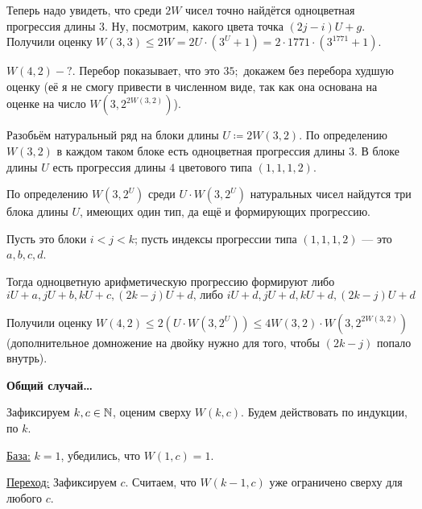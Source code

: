 \documentclass[a4paper]{report}
\begin{document}
{{            Теперь надо увидеть, что среди $2W$ чисел точно найдётся одноцветная прогрессия длины $3$.
            Ну, посмотрим, какого цвета точка $(2j - i)U + g$.
            Получили оценку $W(3, 3) \le 2W = 2U \cdot (3^U + 1) = 2 \cdot 1771 \cdot (3^{1771} + 1)$.
            \item $W(4, 2) - ?$. Перебор показывает, что это $35$;\ докажем без перебора худшую оценку (её я не смогу привести в численном виде, так как она основана на оценке на число $W(3, 2^{2W(3, 2)})$).

            Разобьём натуральный ряд на блоки длины $U \coloneqq 2W(3, 2)$. По определению $W(3, 2)$ в каждом таком блоке есть одноцветная прогрессия длины $3$.
            В блоке длины $U$ есть прогрессия длины $4$ цветового типа $(1,1,1,2)$.

            По определению $W(3, 2^{U})$ среди $U \cdot W(3, 2^{U})$  натуральных чисел найдутся три блока длины $U$, имеющих один тип, да ещё и формирующих прогрессию.

            Пусть это блоки $i < j < k$; пусть индексы прогрессии типа $(1,1,1,2)$ --- это $a, b, c, d$.

            Тогда одноцветную арифметическую прогрессию формируют либо \[iU + a, jU + b, kU + c, (2k - j)U + d\text{, либо }iU + d, jU + d, kU + d, (2k - j)U + d\]

            Получили оценку $W(4, 2) \le 2(U \cdot W(3, 2^U)) \le 4W(3, 2) \cdot W(3, 2^{2W(3, 2)})$ (дополнительное домножение на двойку нужно для того, чтобы $(2k - j)$ попало внутрь).

            \item \textbf{Общий случай\ldots}

            Зафиксируем $k, c \in \mathbb{N}$, оценим сверху $W(k, c)$. Будем действовать по индукции, по $k$.

            \underline{База:} $k = 1$, убедились, что $W(1, c) = 1$.

            \underline{Переход:} Зафиксируем $c$.
            Считаем, что $W(k - 1, c)$ уже ограничено сверху для любого $c$.

}}
\end{document}
